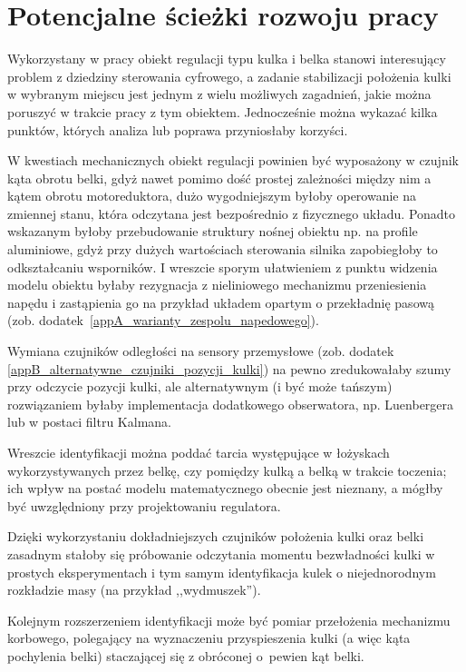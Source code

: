 \section{Potencjalne ścieżki rozwoju pracy}

Wykorzystany w pracy obiekt regulacji typu kulka i belka stanowi interesujący problem z dziedziny sterowania cyfrowego, a zadanie stabilizacji położenia kulki w wybranym miejscu jest jednym z wielu możliwych zagadnień, jakie można poruszyć w trakcie pracy z tym obiektem. Jednocześnie można wykazać kilka punktów, których analiza lub poprawa przyniosłaby korzyści.

W kwestiach mechanicznych obiekt regulacji powinien być wyposażony w czujnik kąta obrotu belki, gdyż nawet pomimo dość prostej zależności między nim a kątem obrotu motoreduktora, dużo wygodniejszym byłoby operowanie na zmiennej stanu, która odczytana jest bezpośrednio z fizycznego układu. Ponadto wskazanym byłoby przebudowanie struktury nośnej obiektu np. na profile aluminiowe, gdyż przy dużych wartościach sterowania silnika zapobiegłoby to odkształcaniu wsporników. I wreszcie sporym ułatwieniem z punktu widzenia modelu obiektu byłaby rezygnacja z nieliniowego mechanizmu przeniesienia napędu i zastąpienia go na przykład układem opartym o przekładnię pasową (zob. dodatek~\ref{appA_warianty_zespolu_napedowego}).

Wymiana czujników odległości na sensory przemysłowe (zob. dodatek \ref{appB_alternatywne_czujniki_pozycji_kulki}) na pewno zredukowałaby szumy przy odczycie pozycji kulki, ale alternatywnym (i być może tańszym) rozwiązaniem byłaby implementacja dodatkowego obserwatora, np. Luenbergera lub w postaci filtru Kalmana.

Wreszcie identyfikacji można poddać tarcia występujące w łożyskach wykorzystywanych przez belkę, czy pomiędzy kulką a belką w trakcie toczenia; ich wpływ na postać modelu matematycznego obecnie jest nieznany, a mógłby być uwzględniony przy projektowaniu regulatora.

Dzięki wykorzystaniu dokładniejszych czujników położenia kulki oraz belki zasadnym stałoby się próbowanie odczytania momentu bezwładności kulki w prostych eksperymentach i tym samym identyfikacja kulek o niejednorodnym rozkładzie masy (na przykład ,,wydmuszek'').

Kolejnym rozszerzeniem identyfikacji może być pomiar przełożenia mechanizmu korbowego, polegający na wyznaczeniu przyspieszenia kulki (a więc kąta pochylenia belki) staczającej się z obróconej o~pewien kąt belki.

